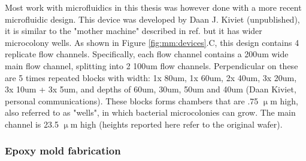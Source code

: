 % 
%
%
%


Most work with microfluidics in this thesis was however done with a more recent microfluidic design.
This device was developed by Daan J. Kiviet (unpublished), it is similar to the "mother machine" described in ref. \cite{Taheri-Araghi2014} but it has wider microcolony wells. As shown in Figure \ref{fig:mm:devices}.C, this design contains 4 replicate flow channels.
Specifically, each flow channel contains a 200um wide main flow channel, splitting into 2 100um flow channels. 
Perpendicular on these are 5 times repeated blocks with width: 1x 80um, 1x 60um, 2x 40um, 3x 20um, 3x 10um + 3x 5um, and depths of 60um, 30um, 50um and 40um (Daan Kiviet, personal communications).
These blocks forms chambers that are .75 $\upmu$m high, also referred to as "wells", in which bacterial microcolonies can grow. The main channel is 23.5 $\upmu$m high (heights reported here refer to the original wafer).

\subsubsection{Epoxy mold fabrication}

